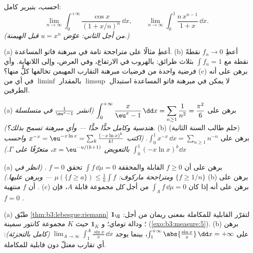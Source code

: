 \begin{exercise}[$\star$]\label{exo:b3:lebesgue:2}
احسب، بتبرير كامل:
\[
\lim_{n\to\infty}\int_0^{+\infty}
\frac{\cos x}{(1 + x/n)^{n}}\,\dd x,
\qquad
\lim_{n\to\infty}\int_0^1 \frac{n\,x^{n-1}}{1 + x}\,\dd x .
\]
\emph{(من أجل الثاني: عوّض $u = x^n$ قبل الهيمنة.)}
\end{exercise}

\begin{exercise}[$\star\star$]\label{exo:b3:lebesgue:3}
(a) أعطِ مثالًا على متراجحة تامة في مبرهنة فاتو المساعدة.
(b) أعطِ $f_n \to 0$ نقطةً نقطة مع $\int f_n = 1$ بثلاث طرائق:
بالهروب في الارتفاع، وفي العرض، وإلى اللانهاية. وأي فرضية واحدة
من فرضيات مبرهنة التقارب المهيمن تخالفها كلٌّ منها؟
(c) برهن على أنه لا يمكن في مبرهنة فاتو المساعدة استبدال
$\limsup$ بالمقدار $\liminf$ في أي من الطرفين.
\end{exercise}

\begin{exercise}[$\star\star$]\label{exo:b3:lebesgue:4}
(a) برهن على $\displaystyle\int_0^{+\infty}\frac{x}{\eu^x -
1}\,\dd x = \sum_{n\geq1}\frac1{n^2} = \frac{\pi^2}6$ \emph{(انشر $\frac1{\eu^x - 1}$ في متسلسلة هندسية
وكامل حدًّا حدًّا --- وأي مبرهنة تسمح بذلك؟)}.
(b) (حلم طالب السنة الثانية) برهن على $\displaystyle\int_0^1 x^{-x}\,\dd x = \sum_{n\geq1}n^{-n}$. \emph{(اكتب
$x^{-x} = \eu^{-x\ln x} = \sum_k\frac{(-x\ln
x)^k}{k!}$ واحسب $\int_0^1(-x\ln x)^k\dd x$ بالتعويض $x = \eu^{-u/(k+1)}$، متعرّفًا على $\Gamma$.)}
\end{exercise}

\begin{exercise}[$\star\star$]\label{exo:b3:lebesgue:5}
(a) برهن على أن $f \geq 0$ القابلة  والمحققة $\int f\,\dd\mu = 0$ تحقق
$f = 0$ . \emph{(انظر في $\{f \geq 1/n\}$
ومتراجحة ماركوف: $\mu(\{f \geq a\}) \leq \frac1a\int f$ --- وبرهن عليها.)}
(b) برهن على أن  $f$ منتهية .
(c) برهن على أنه إذا كان $\int_A f\,\dd\mu = 0$ من أجل \emph{كل} مجموعة قابلة
 $A$، فإن $f = 0$ .
\end{exercise}

\begin{exercise}[$\star\star$]\label{exo:b3:lebesgue:6}
(a) طبّق \cref{thm:b3:lebesgue:riemann} لتقرّر القابلية للمكاملة بمعنى ريمان من أجل:
$\mathbf 1_\Q$؛ ودالة توماي؛ و $\mathbf
1_K$ حيث $K$ مجموعة كانتور
سمينة (\cref{exo:b3:measure:5}).
(b) برهن على $\int_1^{+\infty}\abs{\frac{\sin x}x}\,\dd x =
+\infty$، بينما يوجد $\lim_{A\to\infty}\int_1^A\frac{\sin
x}x\,\dd x$ \emph{(كامل بالتجزئة)}:
أي تقارب معتلّ دون قابلية للمكاملة.
\end{exercise}

